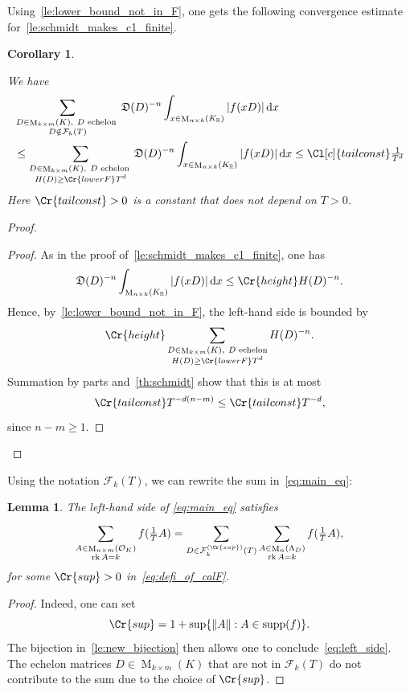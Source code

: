 \documentclass{amsart}
\newtheorem{corollary}[theorem]{Corollary}
\newtheorem{lemma}[theorem]{Lemma}
\theoremstyle{definition}
\theoremstyle{remark}
\newcommand{\OK}{\mathcal{O}_K}
\newcommand{\KR}{K_\mathbb{R}}
\newcommand{\diff}{\,\mathrm{d}}
\DeclareMathOperator{\M}{M}
\DeclareMathOperator{\rank}{rk}
\DeclareMathOperator{\supp}{supp}
\begin{document}
Using~\cref{le:lower_bound_not_in_F}, one gets the following convergence estimate for~\cref{le:schmidt_makes_c1_finite}.
\begin{corollary}
    \label{co:tail}

    We have 
    \begin{align}
  &  \sum_{\substack{D \in \M_{k \times m}(K),~D \text{ echelon } \\ D \notin \mathcal{F}_{k}(T)}}^{}\mathfrak{D}(D)^{-n} \int_{x \in \M_{n \times k}(\KR)}^{} | f(xD) |\diff x   \\
  & \leq
   \sum_{\substack{D \in \M_{k \times m}(K),~D \text{ echelon } \\ H(D) \geq \Cr{lowerF} T^{d}}}^{}\mathfrak{D}(D)^{-n} \int_{x \in \M_{n \times k}(\KR)}^{} |f(xD) | \diff x \leq  \Cl[c]{tailconst}  \tfrac{1}{T^{d}}
    \end{align}
    Here $\Cr{tailconst}>0$ is a constant that does not depend on $T>0$.
\end{corollary}
\begin{proof}
      \begin{proof}
  As in the proof of~\cref{le:schmidt_makes_c1_finite}, one has
  \[
  \mathfrak{D}(D)^{-n}
  \int_{\M_{n \times k}(\KR)} |f(xD)|\diff x
  \leq \Cr{height} H(D)^{-n}.
  \]
  Hence, by~\cref{le:lower_bound_not_in_F}, the left-hand side is bounded by
  \[
  \Cr{height}
  \sum_{\substack{D \in \M_{k \times m}(K),~D\text{ echelon}\\
  H(D)\geq \Cr{lowerF}T^{d}}}
  H(D)^{-n}.
  \]
  Summation by parts and~\cref{th:schmidt} show that this is at most
  \[
  \Cr{tailconst}T^{-d(n-m)}
  \leq \Cr{tailconst}T^{-d},
  \]
  since \(n-m\geq1\).
  \end{proof}

\end{proof}



Using the notation $\mathcal{F}_{k}(T)$, we can rewrite the sum in~\cref{eq:main_eq}: 
\begin{lemma}
    \label{le:crude_bound}
    The left-hand side of \cref{eq:main_eq} satisfies
    \begin{equation}
        \label{eq:left_side}
        \sum_{\substack{A \in \M_{n \times m}(\OK) \\ \rank A = k}} f( \tfrac{1}{T} A) =
        \sum_{D \in \mathcal{F}^{(\Cr{sup})}_{k}(T)}^{}  \sum_{\substack{A \in \M_{n}(\Lambda_{D}) \\ \rank A = k}} f( \tfrac{1}{T} A),
    \end{equation}
    for some $\Cr{sup} > 0$ in~\cref{eq:defi_of_calF}.
\end{lemma}
\begin{proof}
    Indeed, one can set
    \begin{equation}
        \Cr{sup} = 1 + \sup\{ \|A\| : A \in \supp(f)\}.
        \label{eq:choice_of_sup}
    \end{equation}
    The bijection in~\cref{le:new_bijection} then allows one to conclude~\cref{eq:left_side}. The echelon matrices $D \in \M_{k \times m}(K)$ that are not in $\mathcal{F}_{k}(T)$ do not contribute to the sum due to the choice of $\Cr{sup}$.
\end{proof}
\end{document}
